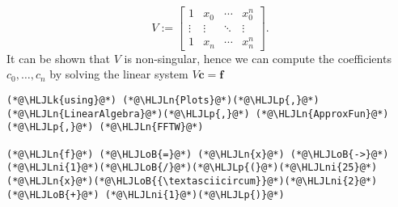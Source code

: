 \documentclass[12pt,a4paper]{article}
\newcommand{\HLJLk}[1]{\textcolor[RGB]{148,91,176}{\textbf{#1}}}
\newcommand{\HLJLn}[1]{#1}
\newcommand{\HLJLni}[1]{\textcolor[RGB]{59,151,46}{#1}}
\newcommand{\HLJLoB}[1]{\textcolor[RGB]{102,102,102}{\textbf{#1}}}
\newcommand{\HLJLp}[1]{#1}
\begin{document}
\[
V := \begin{bmatrix} 1 & x_0 & \ensuremath{\cdots} & x_0^{n} \\
                    \ensuremath{\vdots} & \ensuremath{\vdots} & \ensuremath{\ddots} & \ensuremath{\vdots} \\
                    1 & x_n & \ensuremath{\cdots} & x_n^{n}
                    \end{bmatrix}.
\]
It can be shown that $V$ is non-singular, hence we can compute the coefficients $c_0, \ldots, c_n$ by solving the linear system $V\mathbf{c} = \mathbf{f}$


\begin{lstlisting}
(*@\HLJLk{using}@*) (*@\HLJLn{Plots}@*)(*@\HLJLp{,}@*) (*@\HLJLn{LinearAlgebra}@*)(*@\HLJLp{,}@*) (*@\HLJLn{ApproxFun}@*)(*@\HLJLp{,}@*) (*@\HLJLn{FFTW}@*)

(*@\HLJLn{f}@*) (*@\HLJLoB{=}@*) (*@\HLJLn{x}@*) (*@\HLJLoB{->}@*) (*@\HLJLni{1}@*)(*@\HLJLoB{/}@*)(*@\HLJLp{(}@*)(*@\HLJLni{25}@*)(*@\HLJLn{x}@*)(*@\HLJLoB{{\textasciicircum}}@*)(*@\HLJLni{2}@*) (*@\HLJLoB{+}@*) (*@\HLJLni{1}@*)(*@\HLJLp{)}@*)


\end{lstlisting}
\end{document}
